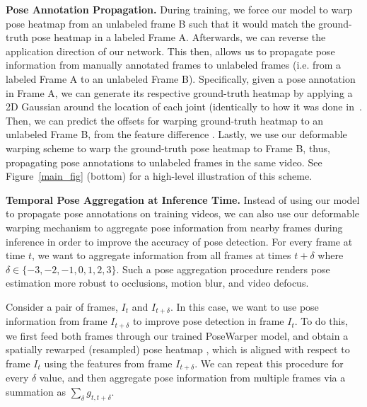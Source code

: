 \documentclass{article}
\begin{document}
\textbf{Pose Annotation Propagation.} During training, we force our model to warp pose heatmap  from an unlabeled frame B such that it would match the ground-truth pose heatmap in a labeled Frame A. Afterwards, we can reverse the application direction of our network. This then, allows us to propagate pose information from manually annotated frames to unlabeled frames (i.e. from a labeled Frame A to an unlabeled Frame B).  Specifically, given a pose annotation in Frame A, we can generate its respective ground-truth heatmap   by applying a 2D Gaussian around the location of each joint (identically to how it was done in~\cite{xiao2018simple,sun2019deep}. Then, we can predict the offsets for warping ground-truth heatmap   to an unlabeled Frame B, from the feature difference . Lastly, we use our deformable warping scheme to warp the ground-truth pose heatmap  to Frame B, thus, propagating pose annotations to unlabeled frames in the same video. See Figure~\ref{main_fig} (bottom) for a high-level illustration of this scheme.








\textbf{Temporal Pose Aggregation at Inference Time.}
Instead of using our model to propagate pose annotations on training videos, we can also use our deformable warping mechanism to aggregate pose information from nearby frames during inference in order to improve the accuracy of pose detection. For every frame at time $t$, we want to aggregate information from all frames at times $t+\delta$ where $\delta \in \{-3,-2,-1,0,1,2,3\}$. Such a pose aggregation procedure renders pose estimation more robust to occlusions, motion blur, and video defocus.

Consider a pair of frames, $I_t$ and $I_{t+\delta}$. In this case, we want to use pose information from frame $I_{t+\delta}$ to improve pose detection in frame $I_t$.  To do this, we first feed both frames through our trained PoseWarper model, and obtain a spatially rewarped (resampled) pose heatmap , which is aligned with respect to frame $I_t$ using the features from frame $I_{t+\delta}$. We can repeat this procedure for every $\delta$ value, and then aggregate pose information from multiple frames via a summation as $\sum_{\delta}g_{t,t+\delta}$. \
\end{document}
